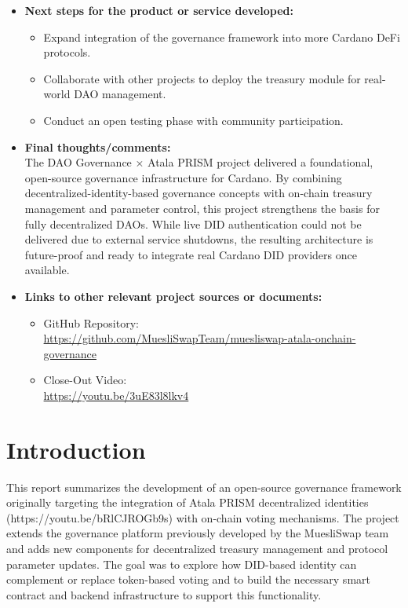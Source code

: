\documentclass[11pt]{article}
\begin{document}
\begin{itemize}[leftmargin=1cm]
    \item \textbf{Next steps for the product or service developed:}
    \begin{itemize}
        \item Expand integration of the governance framework into more Cardano DeFi protocols.
        \item Collaborate with other projects to deploy the treasury module for real-world DAO management.
        \item Conduct an open testing phase with community participation.
    \end{itemize}

    \item \textbf{Final thoughts/comments:}\\
    The DAO Governance × Atala PRISM project delivered a foundational, open-source governance infrastructure for Cardano. By combining decentralized-identity-based governance concepts with on-chain treasury management and parameter control, this project strengthens the basis for fully decentralized DAOs. While live DID authentication could not be delivered due to external service shutdowns, the resulting architecture is future-proof and ready to integrate real Cardano DID providers once available.

    \item \textbf{Links to other relevant project sources or documents:}
    \begin{itemize}
        \item GitHub Repository:\\ \url{https://github.com/MuesliSwapTeam/muesliswap-atala-onchain-governance}
        \item Close-Out Video:\\ \url{https://youtu.be/3uE83l8lkv4}
    \end{itemize}
\end{itemize}

\section{Introduction}
This report summarizes the development of an open-source governance framework originally targeting the integration of Atala PRISM decentralized identities (https://youtu.be/bRlCJROGb9s) with on-chain voting mechanisms.
The project extends the governance platform previously developed by the MuesliSwap team and adds new components for decentralized treasury management and protocol parameter updates.  
The goal was to explore how DID-based identity can complement or replace token-based voting and to build the necessary smart contract and backend infrastructure to support this functionality.
\end{document}
